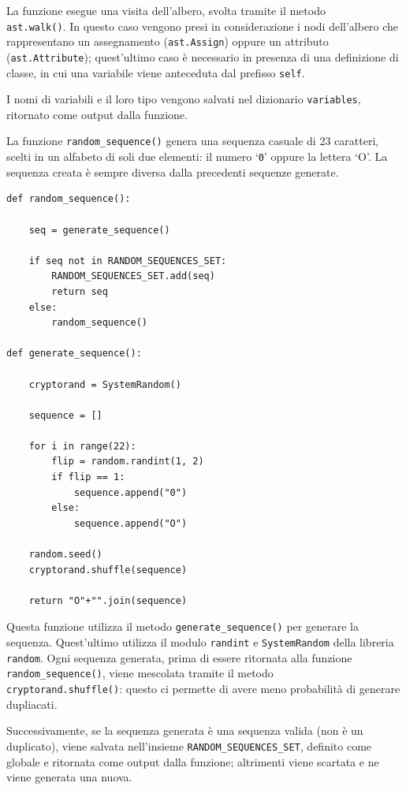 \documentclass[a4paper,oneside,openright,titlepage,10pt,footinclude,headinclude]{scrbook}
\begin{document}
La funzione esegue una visita dell'albero, svolta tramite il metodo \\ \texttt{ast.walk()}. In questo caso vengono presi in considerazione i nodi dell'albero che rappresentano un assegnamento (\texttt{ast.Assign}) oppure un attributo (\texttt{ast.Attribute}); quest'ultimo caso è necessario in presenza di una definizione di classe, in cui una variabile viene anteceduta dal prefisso \texttt{self}.

I nomi di variabili e il loro tipo vengono salvati nel dizionario \texttt{variables}, ritornato come output dalla funzione.\bigskip

La funzione \texttt{random\_sequence()} genera una sequenza casuale di 23 caratteri, scelti in un alfabeto di soli due elementi: il numero `\texttt{0}' oppure la lettera `O'. La sequenza creata è sempre diversa dalla precedenti sequenze generate.
\begin{graybox}[innerleftmargin=2,]
\begin{lstlisting}
def random_sequence():

    seq = generate_sequence()

    if seq not in RANDOM_SEQUENCES_SET:
        RANDOM_SEQUENCES_SET.add(seq)
        return seq
    else:
        random_sequence()

def generate_sequence():

    cryptorand = SystemRandom()

    sequence = []

    for i in range(22):
        flip = random.randint(1, 2)
        if flip == 1:
            sequence.append("0")
        else:
            sequence.append("O")

    random.seed()
    cryptorand.shuffle(sequence)

    return "O"+"".join(sequence)
\end{lstlisting}
\end{graybox}

Questa funzione utilizza il metodo \texttt{generate\_sequence()} per generare la sequenza. Quest'ultimo utilizza il modulo \texttt{randint} e \texttt{SystemRandom} della libreria \texttt{random}.  Ogni sequenza generata, prima di essere ritornata alla funzione \texttt{random\_sequence()}, viene mescolata tramite il metodo \\ \texttt{cryptorand.shuffle()}: questo ci permette di avere meno probabilità di generare dupliacati.

Successivamente, se la sequenza generata è una sequenza valida (non è un duplicato), viene salvata nell'insieme \texttt{RANDOM\_SEQUENCES\_SET}, definito come globale e ritornata come output dalla funzione; altrimenti viene scartata e ne viene generata una nuova.\bigskip
\end{document}
